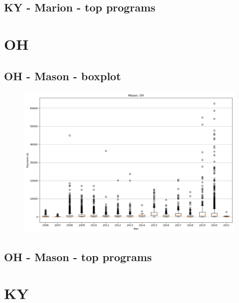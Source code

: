 \subsection*{KY - Marion - top programs}

\newpage
\section*{OH}
\subsection*{OH - Mason - boxplot}
\begin{figure}[h]
\centering
\includegraphics[width=7in]{../output/boxplots/counties/Mason-OH_boxplot.png}
\end{figure}


\subsection*{OH - Mason - top programs}

\newpage
\section*{KY}
